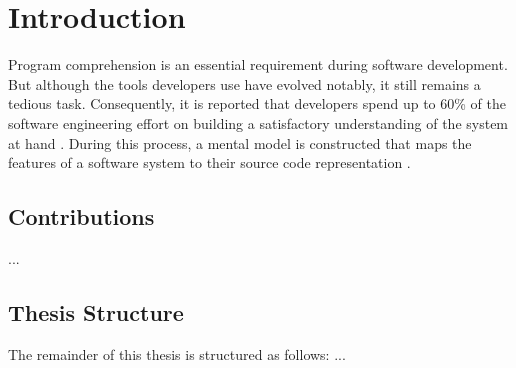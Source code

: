 \chapter{Introduction}
\label{c:introduction}

Program comprehension is an essential requirement during software development.
But although the tools developers use have evolved notably, it still remains a tedious task.
Consequently, it is reported that developers spend up to 60\% of the software engineering effort on building a satisfactory understanding of the system at hand \cite{corbi_program_1989, basili_evolving_1997, cornelissen_execution_2008}.
During this process, a mental model is constructed that maps the features of a software system to their source code representation \cite{latoza_maintaining_2006}.


\section{Contributions}
\label{s:contributions}

\begin{description}[leftmargin=0pt]
\item[First Contribution]
...
\end{description}



\section{Thesis Structure}
\label{s:structure}

The remainder of this thesis is structured as follows:
...

% 
% 